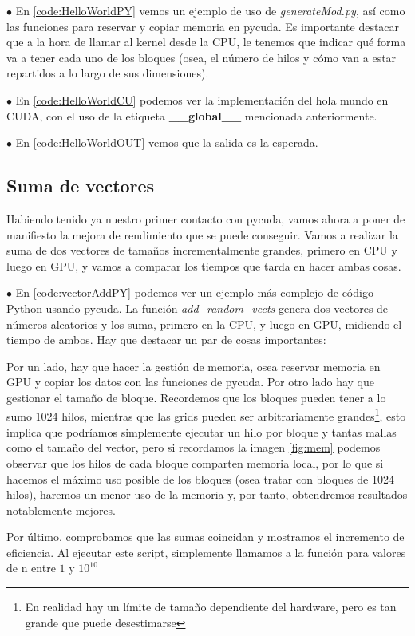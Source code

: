 $\bullet$ En \ref{code:HelloWorldPY} vemos un ejemplo de uso de \textit{generateMod.py}, así como las funciones para reservar y copiar memoria en pycuda. Es importante destacar que a la hora de llamar al kernel desde la CPU, le tenemos que indicar qué forma va a tener cada uno de los bloques (osea, el número de hilos y cómo van a estar repartidos a lo largo de sus dimensiones).

$\bullet$ En \ref{code:HelloWorldCU} podemos ver la implementación del hola mundo en \ac{CUDA}, con el uso de la etiqueta \textbf{\_\_global\_\_} mencionada anteriormente.

$\bullet$ En \ref{code:HelloWorldOUT} vemos que la salida es la esperada.

\subsection{Suma de vectores}
Habiendo tenido ya nuestro primer contacto con pycuda, vamos ahora a poner de manifiesto la mejora de rendimiento que se puede conseguir. Vamos a realizar la suma de dos vectores de tamaños incrementalmente grandes, primero en CPU y luego en GPU, y vamos a comparar los tiempos que tarda en hacer ambas cosas.

$\bullet$ En \ref{code:vectorAddPY} podemos ver un ejemplo más complejo de código Python usando pycuda. La función \textit{add\_random\_vects} genera dos vectores de números aleatorios y los suma, primero en la CPU, y luego en GPU, midiendo el tiempo de ambos. Hay que destacar un par de cosas importantes:

Por un lado, hay que hacer la gestión de memoria, osea reservar memoria en GPU y copiar los datos con las funciones de pycuda. Por otro lado hay que gestionar el tamaño de bloque. Recordemos que los bloques pueden tener a lo sumo 1024 hilos, mientras que las grids pueden ser arbitrariamente grandes\footnote{En realidad hay un límite de tamaño dependiente del hardware, pero es tan grande que puede desestimarse}, esto implica que podríamos simplemente ejecutar un hilo por bloque y tantas mallas como el tamaño del vector, pero si recordamos la imagen \ref{fig:mem} podemos observar que los hilos de cada bloque comparten memoria local, por lo que si hacemos el máximo uso posible de los bloques (osea tratar con bloques de 1024 hilos), haremos un menor uso de la memoria y, por tanto, obtendremos resultados notablemente mejores.

Por último, comprobamos que las sumas coincidan y mostramos el incremento de eficiencia. Al ejecutar este script, simplemente llamamos a la función para valores de n entre $1$ y $10^{10}$

